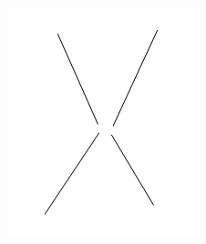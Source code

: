 \begin{enumerate}
\begin{figure}[!h]
\begin{minipage}{0.45\textwidth}
			\includegraphics[width=0.7\linewidth]{pictures/X_cross}
			\caption[X]{}
			\label{fig:xcross}
		\end{minipage}
	\end{figure}
	

\end{enumerate}
